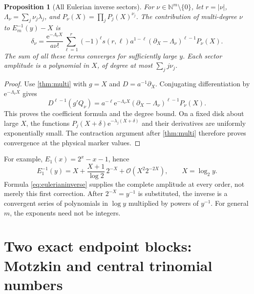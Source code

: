\documentclass[11pt,a4paper]{article}
\newtheorem{proposition}[theorem]{Proposition}
\theoremstyle{definition}
\theoremstyle{remark}
\newcommand{\ee}{\mathrm e}
\newcommand{\NN}{\mathbb N}
\newcommand{\OO}{\mathcal O}
\numberwithin{equation}{section}
\begin{document}
\begin{proposition}[All Eulerian inverse sectors]
For $\nu\in\NN^m\setminus\{0\}$, let $r=|\nu|$, $\Lambda_\nu=\sum_j\nu_j\lambda_j$, and $P_\nu(X)=\prod_jP_j(X)^{\nu_j}$. The contribution of multi-degree $\nu$ to $E_m^{-1}(y)-X$ is
\begin{equation}
 \delta_\nu=
 \frac{\ee^{-\Lambda_\nu X}}{a\nu!}
 \sum_{\ell=1}^r(-1)^\ell s(r,\ell)a^{1-\ell}
 (\partial_X-\Lambda_\nu)^{\ell-1}P_\nu(X).
 \label{eq:eulerianinverse}
\end{equation}
The sum of all these terms converges for sufficiently large $y$. Each sector amplitude is a polynomial in $X$, of degree at most $\sum_jj\nu_j$.
\end{proposition}
\begin{proof}
Use \cref{thm:multi} with $g=X$ and $D=a^{-1}\partial_X$. Conjugating differentiation by $\ee^{-\Lambda_\nu X}$ gives
\[
 D^{\ell-1}(g'Q_\nu)=a^{-\ell}\ee^{-\Lambda_\nu X}
 (\partial_X-\Lambda_\nu)^{\ell-1}P_\nu(X).
\]
This proves the coefficient formula and the degree bound. On a fixed disk about large $X$, the functions $P_j(X+\delta)\ee^{-\lambda_j(X+\delta)}$ and their derivatives are uniformly exponentially small. The contraction argument after \cref{thm:multi} therefore proves convergence at the physical marker values.
\end{proof}

For example, $E_1(x)=2^x-x-1$, hence
\[
 E_1^{-1}(y)=X+\frac{X+1}{\log2}\,2^{-X}
 +\OO(X^2 2^{-2X}),\qquad X=\log_2 y.
\]
Formula \eqref{eq:eulerianinverse} supplies the complete amplitude at every order, not merely this first correction. After $2^{-X}=y^{-1}$ is substituted, the inverse is a convergent series of polynomials in $\log y$ multiplied by powers of $y^{-1}$. For general $m$, the exponents need not be integers.

\section{Two exact endpoint blocks: Motzkin and central trinomial numbers}
\label{sec:endpoints}
\end{document}
